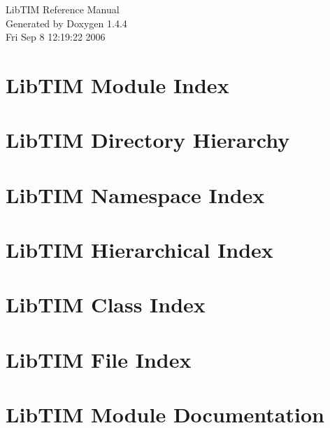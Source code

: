 \documentclass[a4paper]{book}
\begin{document}
\begin{titlepage}
\vspace*{7cm}
\begin{center}
{\Large Lib\-TIM Reference Manual}\\
\vspace*{1cm}
{\large Generated by Doxygen 1.4.4}\\
\vspace*{0.5cm}
{\small Fri Sep 8 12:19:22 2006}\\
\end{center}
\end{titlepage}
\clearemptydoublepage
{}
\tableofcontents
\clearemptydoublepage
{}
\chapter{Lib\-TIM Module Index}

\chapter{Lib\-TIM Directory Hierarchy}

\chapter{Lib\-TIM Namespace Index}

\chapter{Lib\-TIM Hierarchical Index}

\chapter{Lib\-TIM Class Index}

\chapter{Lib\-TIM File Index}

\chapter{Lib\-TIM Module Documentation}
























\end{document}
